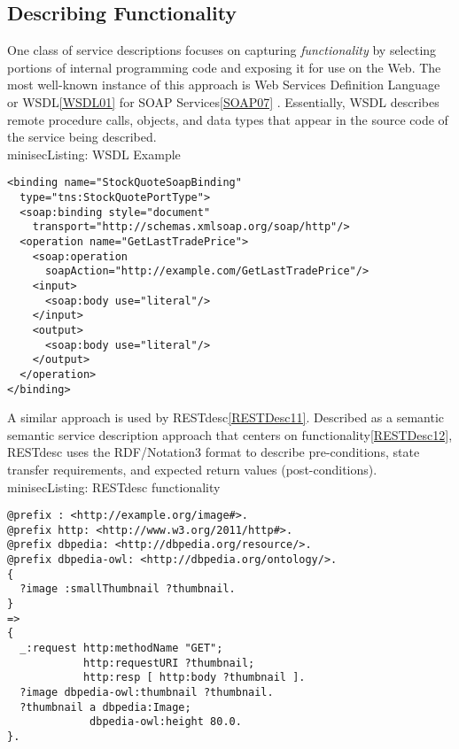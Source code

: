 \documentclass{wsrest2014}
\begin{document}
\subsection{Describing Functionality}
\label{_describing_functionality}
 \par{}One class of service descriptions focuses on capturing \emph{functionality} by selecting portions of internal programming code and exposing it for use on the Web. The most well-known instance of this approach is Web Services Definition Language or WSDL\hyperlink{WSDL01}{[WSDL01]} for SOAP Services\hyperlink{SOAP07}{[SOAP07]} . Essentially, WSDL describes remote procedure calls, objects, and data types that appear in the source code of the service being described.
\\minisec{Listing: WSDL Example}
\begin{verbatim}<binding name="StockQuoteSoapBinding"
  type="tns:StockQuotePortType">
  <soap:binding style="document"
    transport="http://schemas.xmlsoap.org/soap/http"/>
  <operation name="GetLastTradePrice">
    <soap:operation
      soapAction="http://example.com/GetLastTradePrice"/>
    <input>
      <soap:body use="literal"/>
    </input>
    <output>
      <soap:body use="literal"/>
    </output>
  </operation>
</binding>\end{verbatim}

 \par{}A similar approach is used by RESTdesc\hyperlink{RESTDesc11}{[RESTDesc11]}. Described as \textquotedbl{}a semantic semantic service description approach that centers on functionality\textquotedbl{}\hyperlink{RESTDesc12}{[RESTDesc12]}, RESTdesc uses the RDF/Notation3 format to describe pre-conditions, state transfer requirements,  and expected return values (post-conditions).
\\minisec{Listing: RESTdesc functionality}
\begin{verbatim}@prefix : <http://example.org/image#>.
@prefix http: <http://www.w3.org/2011/http#>.
@prefix dbpedia: <http://dbpedia.org/resource/>.
@prefix dbpedia-owl: <http://dbpedia.org/ontology/>.
{
  ?image :smallThumbnail ?thumbnail.
}
=>
{
  _:request http:methodName "GET";
            http:requestURI ?thumbnail;
            http:resp [ http:body ?thumbnail ].
  ?image dbpedia-owl:thumbnail ?thumbnail.
  ?thumbnail a dbpedia:Image;
             dbpedia-owl:height 80.0.
}.\end{verbatim}
\end{document}
